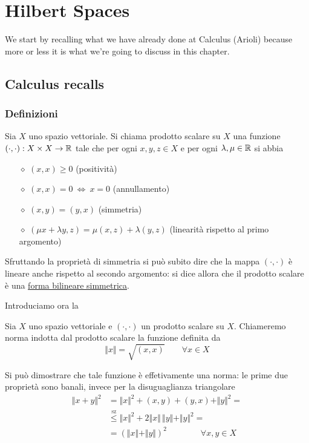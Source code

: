 
\chapter{Hilbert Spaces}
\thispagestyle{empty}

We start by recalling what we have already done at Calculus \uppercase\expandafter{} (Arioli) because more or less it is what we're going to discuss in this chapter.

\section{Calculus \uppercase\expandafter{} recalls} %
\label{sec:calculus_3_recalls}

\subsection{Definizioni} %
\label{sub:definizioni}

\begin{defn}
Sia $X$ uno spazio vettoriale. Si chiama prodotto scalare su $X$ una funzione $(\cdot,\cdot):X\times X\to\mathbb{R}$ tale che per ogni $x,y,z\in X$ e per ogni $\lambda,\mu\in\mathbb{R}$ si abbia
\begin{enumerate}
    \item [$\diamond$] $(x,x)\geq 0$ (positività)
    \item [$\diamond$] $(x,x)=0\ \Leftrightarrow\ x=0$ (annullamento)
    \item [$\diamond$] $(x,y)=(y,x)$ (simmetria)
    \item [$\diamond$] $(\mu x+\lambda y,z)=\mu(x,z)+\lambda(y,z)$ (linearità rispetto al primo argomento)
\end{enumerate}
\end{defn}
Sfruttando la proprietà di simmetria si può subito dire che la mappa $(\cdot,\cdot)$ è lineare anche rispetto al secondo argomento: si dice allora che il prodotto scalare è una \underline{forma bilineare simmetrica}.

Introduciamo ora la
\begin{defn}
Sia $X$ uno spazio vettoriale e $(\cdot,\cdot)$ un prodotto scalare su $X$. Chiameremo norma indotta dal prodotto scalare la funzione definita da
\begin{equation*}
\Vert x\Vert =\sqrt{(x,x)} \qquad \forall x \in X
\end{equation*}
\end{defn}
Si può dimostrare che tale funzione è effetivamente una norma: le prime due proprietà sono banali, invece per la disuguaglianza triangolare
\begin{align*}
\Vert x+y \Vert ^2&=\Vert x \Vert^2+(x,y)+(y,x)+\Vert y \Vert^2= \\
&\overset{\underset{\text{SZ}}{}}{\leq} \Vert x \Vert^2+2\Vert x\Vert\,\Vert y\Vert +\Vert y \Vert^2= \\
&=\left(\Vert x\Vert+\Vert y\Vert\right)^2 \qquad \qquad \forall x,y\in X
\end{align*}

